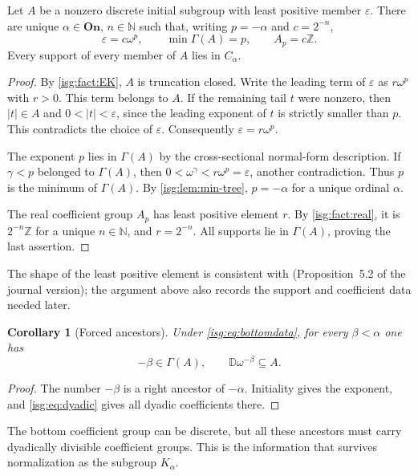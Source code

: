 \documentclass[11pt]{article}
\newtheorem{corollary}[corollary]{Corollary}
\theoremstyle{definition}
\theoremstyle{remark}
\newcommand{\On}{\ensuremath{\mathbf{On}}}
\newcommand{\Z}{\mathbb{Z}}
\newcommand{\N}{\mathbb{N}}
\newcommand{\D}{\mathbb{D}}
\begin{document}
\begin{proposition}\label{isg:prop:bottom}
Let $A$ be a nonzero discrete initial subgroup with least positive
member $\varepsilon$. There are unique $\alpha\in\On$, $n\in\N$
such that, writing $p=-\alpha$ and $c=2^{-n}$,
\begin{equation}\label{isg:eq:bottomdata}
 \varepsilon=c\omega^p,\qquad
 \min\Gamma(A)=p,\qquad A_p=c\Z.
\end{equation}
Every support of every member of $A$ lies in $C_\alpha$.
\end{proposition}
\begin{proof}
By \cref{isg:fact:EK}, $A$ is truncation closed. Write the leading term of
$\varepsilon$ as $r\omega^p$ with $r>0$. This term belongs to $A$.
If the remaining tail $t$ were nonzero, then $|t|\in A$ and
$0<|t|<\varepsilon$, since the leading exponent of $t$ is strictly
smaller than $p$. This contradicts the choice of $\varepsilon$.
Consequently $\varepsilon=r\omega^p$.

The exponent $p$ lies in $\Gamma(A)$ by the cross-sectional normal-form
description. If $\gamma<p$ belonged to $\Gamma(A)$, then
$0<\omega^\gamma<r\omega^p=\varepsilon$, another contradiction.
Thus $p$ is the minimum of $\Gamma(A)$. By \cref{isg:lem:min-tree},
$p=-\alpha$ for a unique ordinal $\alpha$.

The real coefficient group $A_p$ has least positive element $r$.
By \cref{isg:fact:real}, it is $2^{-n}\Z$ for a unique $n\in\N$, and
$r=2^{-n}$. All supports lie in $\Gamma(A)$, proving the last assertion.
\end{proof}

The shape of the least positive element is consistent with
\cite[Proposition~9 and its proof]{EK} (Proposition~5.2 of the journal
version); the argument above also records
the support and coefficient data needed later.

\begin{corollary}[Forced ancestors]\label{isg:cor:forced}
Under \eqref{isg:eq:bottomdata}, for every $\beta<\alpha$ one has
\[
 -\beta\in\Gamma(A),\qquad \D\omega^{-\beta}\subseteq A.
\]
\end{corollary}
\begin{proof}
The number $-\beta$ is a right ancestor of $-\alpha$.
Initiality gives the exponent, and \eqref{isg:eq:dyadic} gives all dyadic
coefficients there.
\end{proof}

The bottom coefficient group can be discrete, but all these ancestors
must carry dyadically divisible coefficient groups. This is the information
that survives normalization as the subgroup $K_\alpha$.
\end{document}
